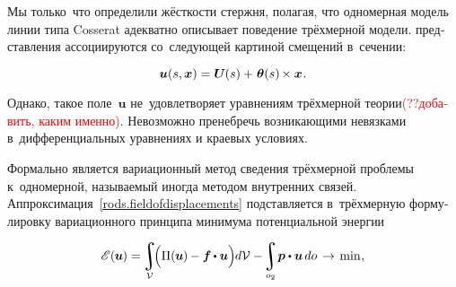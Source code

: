 \begin{otherlanguage}{russian}

Мы только~что определили жёсткости стержня, полагая, что одномерная модель линии типа Cosserat адекватно описывает поведение трёхмерной модели.
 представления ассоциируются со~следующей картиной смещений в~сечении:

\nopagebreak\vspace{-0.1em}\begin{equation}\label{rods.fieldofdisplacements}
\bm{u}(s,\bm{x}) = \bm{U}\hspace{-0.1ex}(s) + \hspace{.15ex} \bm{\theta}(s) \hspace{-0.2ex} \times \bm{x}
\hspace{.1ex} .
\end{equation}

\vspace{-0.1em}\noindent
Однако, такое поле~$\bm{u}$ не~удовлетворяет уравнениям трёхмерной теории\textcolor{red}{(??добавить, каким именно)}.
Невозможно пренебречь возникающими невязками в~дифференциальных уравнениях и краевых условиях.

Формально  является вариационный метод сведения трёхмерной проблемы к~одномерной, называемый иногда методом внутренних связей.
Аппроксимация~\eqref{rods.fieldofdisplacements} подставляется в~трёхмерную формулировку вариационного принципа минимума потенциальной энергии~

\nopagebreak\vspace{-0.1em}\begin{equation*}
\potentialenergyfunctional \hspace{.2ex} (\hspace{-0.1ex}\bm{u}\hspace{-0.1ex}) = \hspace{-0.2ex}
\displaystyle\integral\displaylimits_{\mathcal{V}} \hspace{-0.5ex}
\Bigl(
\potential(\hspace{-0.1ex}\bm{u}\hspace{-0.1ex}) \hspace{-0.1ex} - \bm{f} \hspace{-0.1ex} \dotp \bm{u} \Bigr) \hspace{-0.1ex} d\mathcal{V}
- \hspace{-0.3ex}
\displaystyle\integral\displaylimits_{o_2} \hspace{-0.32ex} \bm{p} \dotp \bm{u} \hspace{.33ex} do \hspace{.2ex}
\hspace{.1ex}\to\hspace{.25ex} \mathrm{min}
\hspace{.1ex} ,
\end{equation*}


\end{otherlanguage}
